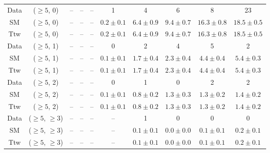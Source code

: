 \begin{table}[h!]
{\begin{tabular}{cccccccccc}
	Data & ($\ge5$, 0) & -- & -- & -- & 1 & 4 & 6 & 8 & 23 \\[0.5ex] 
	SM & ($\ge5$, 0) & -- & -- & -- & $0.2\pm 0.1$ & $6.4\pm 0.9$ & $9.4\pm 0.7$ & $16.3\pm 0.8$ & $18.5\pm 0.5$ \\[0.5ex] 
	Ttw & ($\ge5$, 0) & -- & -- & -- & $0.2\pm 0.1$ & $6.4\pm 0.9$ & $9.4\pm 0.7$ & $16.3\pm 0.8$ & $18.5\pm 0.5$ \\[0.5ex] 
	Data & ($\ge5$, 1) & -- & -- & -- & 0 & 2 & 4 & 5 & 2 \\[0.5ex] 
	SM & ($\ge5$, 1) & -- & -- & -- & $0.1\pm 0.1$ & $1.7\pm 0.4$ & $2.3\pm 0.4$ & $4.4\pm 0.4$ & $5.4\pm 0.3$ \\[0.5ex] 
	Ttw & ($\ge5$, 1) & -- & -- & -- & $0.1\pm 0.1$ & $1.7\pm 0.4$ & $2.3\pm 0.4$ & $4.4\pm 0.4$ & $5.4\pm 0.3$ \\[0.5ex] 
	Data & ($\ge5$, 2) & -- & -- & -- & 0 & 1 & 0 & 2 & 2 \\[0.5ex] 
	SM & ($\ge5$, 2) & -- & -- & -- & $0.1\pm 0.1$ & $0.8\pm 0.2$ & $1.3\pm 0.3$ & $1.3\pm 0.2$ & $1.4\pm 0.2$ \\[0.5ex] 
	Ttw & ($\ge5$, 2) & -- & -- & -- & $0.1\pm 0.1$ & $0.8\pm 0.2$ & $1.3\pm 0.3$ & $1.3\pm 0.2$ & $1.4\pm 0.2$ \\[0.5ex] 
	Data & ($\ge5$, $\ge3$) & -- & -- & -- & -- & 1 & 0 & 0 & 0 \\[0.5ex] 
	SM & ($\ge5$, $\ge3$) & -- & -- & -- & -- & $0.1\pm 0.1$ & $0.0\pm 0.0$ & $0.1\pm 0.1$ & $0.2\pm 0.1$ \\[0.5ex] 
	Ttw & ($\ge5$, $\ge3$) & -- & -- & -- & -- & $0.1\pm 0.1$ & $0.0\pm 0.0$ & $0.1\pm 0.1$ & $0.2\pm 0.1$ \\[0.5ex] 
	\hline
	\hline
\end{tabular}}
\end{table}
